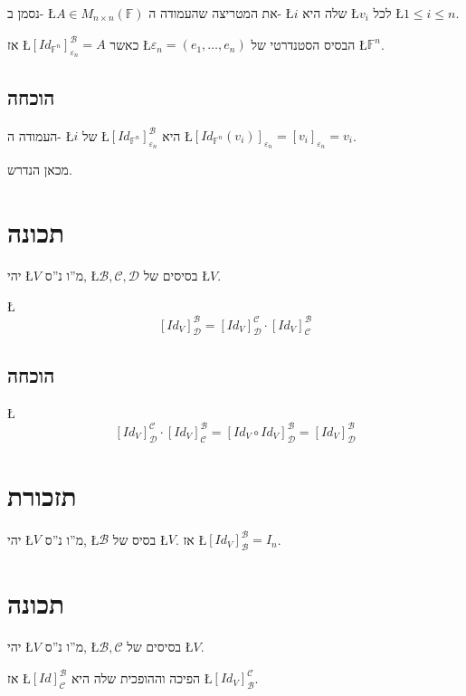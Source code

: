 \documentclass[english,hebrew]{article}
\newcommand{\sqrmn}{M_{n\times n}(\mathbb{F})}
\begin{document}
נסמן ב- \L{$A\in\sqrmn$} את המטריצה שהעמודה ה- \L{$i$} שלה היא \L{$v_{i}$}
לכל \L{$1\leq i\leq n$}. 

אז \L{$[Id_{\mathbb{F}^{n}}]_{\varepsilon_{n}}^{\mathcal{B}}=A$} כאשר \L{$\varepsilon_{n}=(e_{1},\dots,e_{n})$}
הבסיס הסטנדרטי של \L{$\mathbb{F}^{n}$}.

\subsection{הוכחה}

העמודה ה- \L{$i$} של \L{$[Id_{\mathbb{F}^{n}}]_{\varepsilon_{n}}^{\mathcal{B}}$}
היא \L{$[Id_{\mathbb{F}^{n}}(v_{i})]_{\varepsilon_{n}}=[v_{i}]_{\varepsilon_{n}}=v_{i}$}.

מכאן הנדרש.

\section{תכונה}

יהי \L{$V$} מ\textquotedblright ו נ\textquotedblright ס, \L{$\mathcal{B},\mathcal{C},\mathcal{D}$}
בסיסים של \L{$V$}.

\L{%
\[
[Id_{V}]_{\mathcal{D}}^{\mathcal{B}}=[Id_{V}]_{\mathcal{D}}^{\mathcal{C}}\cdot[Id_{V}]_{\mathcal{C}}^{\mathcal{B}}
\]
}%

\subsection{הוכחה}

\L{%
\[
[Id_{V}]_{\mathcal{D}}^{\mathcal{C}}\cdot[Id_{V}]_{\mathcal{C}}^{\mathcal{B}}=[Id_{V}\circ Id_{V}]_{\mathcal{D}}^{\mathcal{B}}=[Id_{V}]_{\mathcal{D}}^{\mathcal{B}}
\]
}%

\section{תזכורת}

יהי \L{$V$} מ\textquotedblright ו נ\textquotedblright ס, \L{$\mathcal{B}$}
בסיס של \L{$V$}. אז \L{$[Id_{V}]_{\mathcal{B}}^{\mathcal{B}}=I_{n}$}.

\section{תכונה}

יהי \L{$V$} מ\textquotedblright ו נ\textquotedblright ס, \L{$\mathcal{B},\mathcal{C}$}
בסיסים של \L{$V$}.

אז \L{$[Id]_{\mathcal{C}}^{\mathcal{B}}$} הפיכה וההופכית שלה היא
\L{$[Id_{V}]_{\mathcal{B}}^{\mathcal{C}}$}.
\end{document}

